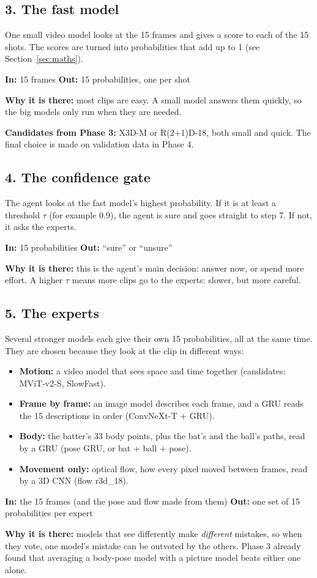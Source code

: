 \documentclass[11pt,a4paper]{article}
\newcommand{\why}[1]{\par\noindent\textbf{Why it is there:} #1}
\newcommand{\inout}[2]{\par\noindent\textbf{In:} #1 \quad
  \textbf{Out:} #2}
\begin{document}
\subsection*{3. The fast model}
One small video model looks at the 15 frames and gives a score to each of
the 15 shots. The scores are turned into probabilities that add up to 1
(see Section~\ref{sec:maths}).
\inout{15 frames}{15 probabilities, one per shot}
\why{most clips are easy. A small model answers them quickly, so the big
models only run when they are needed.}
\par\noindent\textbf{Candidates from Phase 3:} X3D-M or R(2+1)D-18, both
small and quick. The final choice is made on validation data in Phase 4.

\subsection*{4. The confidence gate}
The agent looks at the fast model's highest probability. If it is at least
a threshold $\tau$ (for example $0.9$), the agent is sure and goes straight
to step 7. If not, it asks the experts.
\inout{15 probabilities}{``sure'' or ``unsure''}
\why{this is the agent's main decision: answer now, or spend more effort.
A higher $\tau$ means more clips go to the experts: slower, but more
careful.}

\subsection*{5. The experts}
Several stronger models each give their own 15 probabilities, all at the
same time. They are chosen because they look at the clip in different
ways:
\begin{itemize}[nosep, leftmargin=1.4em]
  \item \textbf{Motion:} a video model that sees space and time together
        (candidates: MViT-v2-S, SlowFast).
  \item \textbf{Frame by frame:} an image model describes each frame,
        and a GRU reads the 15 descriptions in order (ConvNeXt-T + GRU).
  \item \textbf{Body:} the batter's 33 body points, plus the bat's and the
        ball's paths, read by a GRU (pose GRU, or bat + ball + pose).
  \item \textbf{Movement only:} optical flow, how every pixel moved between
        frames, read by a 3D CNN (flow r3d\_18).
\end{itemize}
\inout{the 15 frames (and the pose and flow made from them)}{one set of 15
probabilities per expert}
\why{models that see differently make \emph{different} mistakes, so when
they vote, one model's mistake can be outvoted by the others. Phase 3
already found that averaging a body-pose model with a picture model beats
either one alone.}
\end{document}
